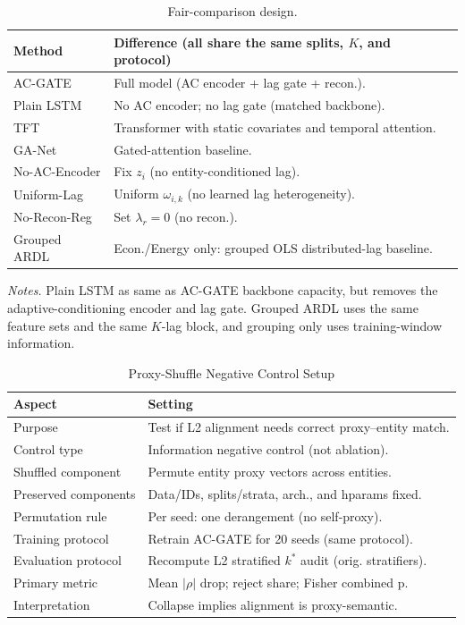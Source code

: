 \documentclass[conference]{IEEEtran}
\begin{document}
\begin{table}[!tbhp]
\caption{Fair-comparison design.}
\label{tab:fair_baselines}
\centering
\scriptsize
\setlength{\tabcolsep}{3pt}
\renewcommand{\arraystretch}{1.03}
\begin{tabular}{p{} p{}}
\toprule
Method & Difference (all share the same splits, $K$, and protocol) \\
\midrule
AC-GATE & Full model (AC encoder + lag gate + recon.). \\
Plain LSTM & No AC encoder; no lag gate (matched backbone). \\
TFT & Transformer with static covariates and temporal attention. \\
GA-Net & Gated-attention baseline. \\
No-AC-Encoder & Fix $z_i$ (no entity-conditioned lag). \\
Uniform-Lag & Uniform $\omega_{i,k}$ (no learned lag heterogeneity). \\
No-Recon-Reg & Set $\lambda_r=0$ (no recon.). \\
Grouped ARDL & Econ./Energy only: grouped OLS distributed-lag baseline. \\
\bottomrule
\end{tabular}
\par\smallskip
{\footnotesize\raggedright\textit{Notes.} Plain LSTM as same as AC-GATE backbone capacity, but removes the adaptive-conditioning encoder and lag gate. Grouped ARDL uses the same feature sets and the same $K$-lag block, and grouping only uses training-window information.\par}
\end{table}

\begin{table}[!tbhp]
\centering
\caption{Proxy-Shuffle Negative Control Setup}
\label{tab:proxy_shuffle_setup}
\footnotesize
\setlength{\tabcolsep}{3pt}
\renewcommand{\arraystretch}{1.05}
\begin{tabular}{@{}l l@{}}
\toprule
Aspect & Setting \\
\midrule
Purpose & Test if L2 alignment needs correct proxy--entity match. \\
Control type & Information negative control (not ablation). \\
Shuffled component & Permute entity proxy vectors across entities. \\
Preserved components & Data/IDs, splits/strata, arch., and hparams fixed. \\
Permutation rule & Per seed: one derangement (no self-proxy). \\
Training protocol & Retrain AC-GATE for 20 seeds (same protocol). \\
Evaluation protocol & Recompute L2 stratified $k^*$ audit (orig. stratifiers). \\
Primary metric & Mean $|\rho|$ drop; reject share; Fisher combined p. \\
Interpretation & Collapse implies alignment is proxy-semantic. \\
\bottomrule
\end{tabular}
\end{table}
\end{document}
